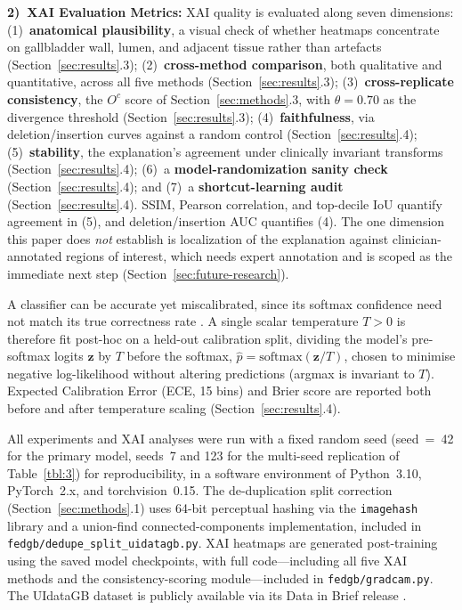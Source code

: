 \textbf{2)~XAI Evaluation Metrics:} XAI quality is evaluated along seven dimensions: (1)~\textbf{anatomical plausibility}, a visual check of whether heatmaps concentrate on gallbladder wall, lumen, and adjacent tissue rather than artefacts (Section~\ref{sec:results}.3); (2)~\textbf{cross-method comparison}, both qualitative and quantitative, across all five methods (Section~\ref{sec:results}.3); (3)~\textbf{cross-replicate consistency}, the $O^c$ score of Section~\ref{sec:methods}.3, with $\theta=0.70$ as the divergence threshold (Section~\ref{sec:results}.3); (4)~\textbf{faithfulness}, via deletion/insertion curves against a random control (Section~\ref{sec:results}.4); (5)~\textbf{stability}, the explanation's agreement under clinically invariant transforms (Section~\ref{sec:results}.4); (6)~a \textbf{model-randomization sanity check} (Section~\ref{sec:results}.4); and (7)~a \textbf{shortcut-learning audit} (Section~\ref{sec:results}.4). SSIM, Pearson correlation, and top-decile IoU quantify agreement in (5), and deletion/insertion AUC quantifies (4). The one dimension this paper does \textit{not} establish is localization of the explanation against clinician-annotated regions of interest, which needs expert annotation and is scoped as the immediate next step (Section~\ref{sec:future-research}).

A classifier can be accurate yet miscalibrated, since its softmax confidence need not match its true correctness rate \cite{ref42}. A single scalar temperature $T>0$ is therefore fit post-hoc on a held-out calibration split, dividing the model's pre-softmax logits $\mathbf{z}$ by $T$ before the softmax, $\hat{p} = \mathrm{softmax}(\mathbf{z}/T)$, chosen to minimise negative log-likelihood without altering predictions (argmax is invariant to $T$). Expected Calibration Error (ECE, 15 bins) and Brier score are reported both before and after temperature scaling (Section~\ref{sec:results}.4).

All experiments and XAI analyses were run with a fixed random seed (seed~=~42 for the primary model, seeds~7 and 123 for the multi-seed replication of Table~\ref{tbl:3}) for reproducibility, in a software environment of Python~3.10, PyTorch~2.x, and torchvision~0.15. The de-duplication split correction (Section~\ref{sec:methods}.1) uses 64-bit perceptual hashing via the \texttt{imagehash} library and a union-find connected-components implementation, included in \texttt{fedgb/dedupe\_split\_uidatagb.py}. XAI heatmaps are generated post-training using the saved model checkpoints, with full code---including all five XAI methods and the consistency-scoring module---included in \texttt{fedgb/gradcam.py}. The UIdataGB dataset is publicly available via its Data in Brief release \cite{ref17}.
